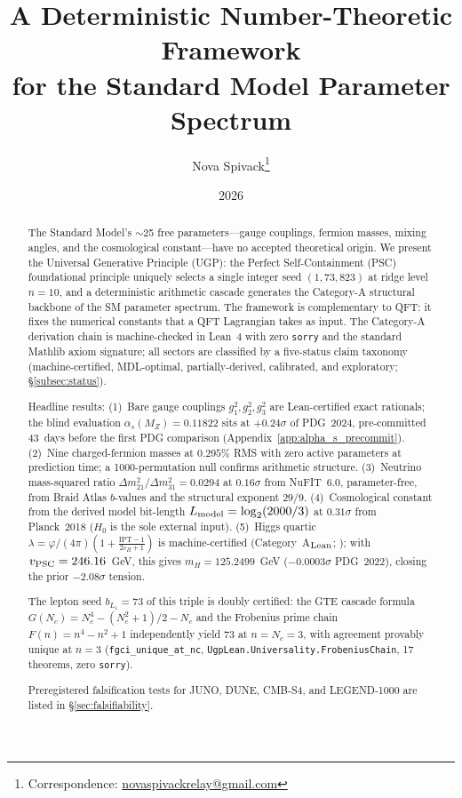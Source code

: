 \documentclass[11pt]{article}
\title{\vspace{-0.6em}\bfseries A Deterministic Number-Theoretic Framework\\for the Standard Model Parameter Spectrum}
\author[1]{Nova Spivack\thanks{Correspondence: \href{mailto:novaspivackrelay@gmail.com}{novaspivackrelay@gmail.com}}}
\affil[1]{Independent Research}
\date{2026}
\theoremstyle{remark}
\begin{document}
\maketitle
\NovaZenodoAfterTitle

\begin{abstract}
The Standard Model's $\sim$25 free parameters---gauge couplings, fermion masses, mixing angles, and the cosmological constant---have no accepted theoretical origin.
We present the Universal Generative Principle (UGP): the Perfect Self-Containment (PSC) foundational principle uniquely selects a single integer seed $(1,73,823)$ at ridge level $n{=}10$, and a deterministic arithmetic cascade generates the Category-A structural backbone of the SM parameter spectrum.
The framework is complementary to QFT: it fixes the numerical constants that a QFT Lagrangian takes as input.
The Category-A derivation chain is machine-checked in Lean~4 with zero \texttt{sorry} and the standard Mathlib axiom signature; all sectors are classified by a five-status claim taxonomy (machine-certified, MDL-optimal, partially-derived, calibrated, and exploratory; \S\ref{subsec:status}).

Headline results:
(1)~Bare gauge couplings $g_1^2, g_2^2, g_3^2$ are Lean-certified exact rationals; the blind evaluation $\alpha_s(M_Z) = 0.11822$ sits at $+0.24\sigma$ of PDG~2024, pre-committed 43~days before the first PDG comparison (Appendix~\ref{app:alpha_s_precommit}).
(2)~Nine charged-fermion masses at $0.295\%$ RMS with zero active parameters at prediction time; a 1000-permutation null confirms arithmetic structure.
(3)~Neutrino mass-squared ratio $\Delta m^2_{21}/\Delta m^2_{31} = 0.0294$ at $0.16\sigma$ from NuFIT~6.0, parameter-free, from Braid Atlas $b$-values and the structural exponent $29/9$.
(4)~Cosmological constant from the derived model bit-length $L_{\rm model} = \log_2(2000/3)$ at $0.31\sigma$ from Planck~2018 ($H_0$ is the sole external input).
(5)~Higgs quartic $\lambda = \varphi/(4\pi)\!\left(1+\frac{\mathrm{IPT}-1}{2c_H+1}\right)$ is machine-certified (Category~A$_{\rm Lean}$; \cite{SpivackGTEUnification,SpivackSRRG}); with $v_{\rm PSC}=246.16$~GeV, this gives $m_H = 125.2499$~GeV ($-0.0003\sigma$ PDG~2022), closing the prior $-2.08\sigma$ tension.

The lepton seed $b_{L_1}=73$ of this triple is doubly certified: the GTE cascade formula $G(N_c)=N_c^4-(N_c^2+1)/2-N_c$ and the Frobenius prime chain $F(n)=n^4-n^2+1$ independently yield $73$ at $n=N_c=3$, with agreement provably unique at $n=3$ (\texttt{fgci\_unique\_at\_nc}, \texttt{UgpLean.Universality.FrobeniusChain}, 17 theorems, zero \texttt{sorry}).

Preregistered falsification tests for JUNO, DUNE, CMB-S4, and LEGEND-1000 are listed in \S\ref{sec:falsifiability}.
\end{abstract}
\end{document}
